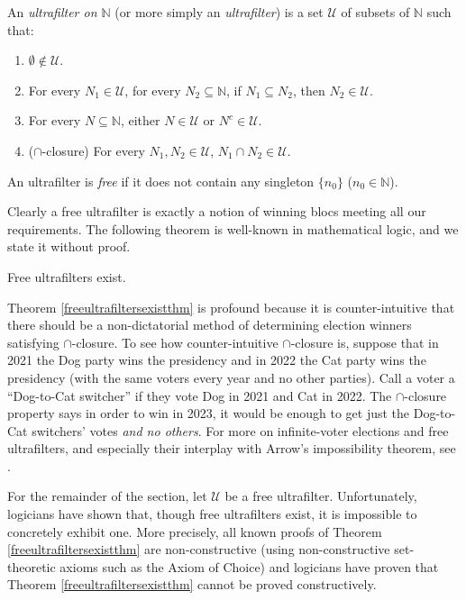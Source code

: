 \documentclass[twoside,11pt]{article}
\begin{document}
\begin{definition}
\label{ultrafilterdefn}
    An \emph{ultrafilter on $\mathbb N$} (or more simply an \emph{ultrafilter})
    is a set $\mathcal U$ of subsets of $\mathbb N$ such that:
    \begin{enumerate}
        \item $\emptyset\not\in\mathcal U$.
        \item For every $N_1\in\mathcal U$, for every $N_2\subseteq \mathbb N$,
        if $N_1\subseteq N_2$, then $N_2\in\mathcal U$.
        \item For every $N\subseteq\mathbb N$, either $N\in\mathcal U$
        or $N^c\in\mathcal U$.
        \item ($\cap$-closure) For every $N_1,N_2\in\mathcal U$, $N_1\cap N_2\in \mathcal U$.
    \end{enumerate}
    An ultrafilter is \emph{free} if it does not contain any singleton
    $\{n_0\}$ ($n_0\in\mathbb N$).
\end{definition}

Clearly a free ultrafilter is exactly a notion of winning blocs meeting all our
requirements.
The following theorem is well-known in mathematical logic, and we state it without
proof.

\begin{theorem}
\label{freeultrafiltersexistthm}
    Free ultrafilters exist.
\end{theorem}

Theorem \ref{freeultrafiltersexistthm} is profound because
it is counter-intuitive that there should be a non-dictatorial method of determining
election winners satisfying $\cap$-closure. To see how counter-intuitive $\cap$-closure
is, suppose that in 2021 the Dog party wins the presidency and in 2022 the
Cat party wins the presidency (with the same voters every year and no other parties).
Call a voter a ``Dog-to-Cat switcher'' if they vote Dog in 2021 and Cat in 2022.
The $\cap$-closure property says in order to win in 2023, it would be enough to
get just the Dog-to-Cat switchers' votes \emph{and no others}.
For more on infinite-voter elections and free ultrafilters,
and especially their interplay with Arrow's impossibility theorem,
see \citet{kirman}.

For the remainder of the section, let $\mathcal U$ be a free ultrafilter.
Unfortunately, logicians have shown that, though free ultrafilters exist,
it is impossible to concretely exhibit one. More precisely, all known proofs
of Theorem \ref{freeultrafiltersexistthm} are non-constructive (using non-constructive
set-theoretic axioms such as the Axiom of Choice) and logicians have proven that
Theorem \ref{freeultrafiltersexistthm} cannot be proved constructively.
\end{document}
